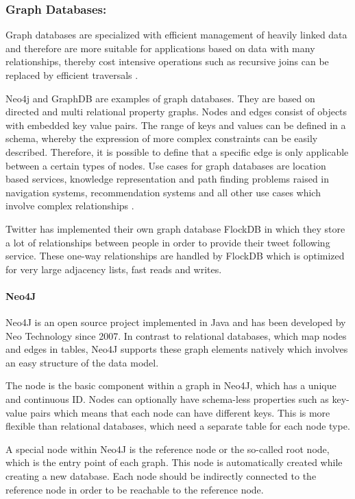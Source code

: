 \subsubsection{Graph Databases:}
Graph databases are specialized with efficient management of heavily linked data and therefore are more suitable for applications based on data with many relationships, thereby cost intensive operations such as recursive joins can be replaced by efficient traversals \cite{Hecht:2011}.

Neo4j and GraphDB are examples of graph databases. They are based on directed and multi relational property graphs. Nodes and edges consist of objects with embedded key value pairs. The range of keys and values can be defined in a schema, whereby the expression of more complex constraints can be easily described. Therefore, it is possible to define that a specific edge is only applicable between a certain types of nodes. Use cases for graph databases are location based services, knowledge representation and path finding problems raised in navigation systems, recommendation systems and all other use cases which involve complex relationships \cite{Hecht:2011}.

Twitter has implemented their own graph database FlockDB in which they store a lot of relationships between people in order to provide their tweet following service. These one-way relationships are handled by FlockDB which is optimized for very large adjacency lists, fast reads and writes.

\paragraph{Neo4J}
Neo4J is an open source project implemented in Java and has been developed by Neo Technology since 2007. In contrast to relational databases, which map nodes and edges in tables, Neo4J supports these graph elements natively which involves an easy structure of the data model.

The node is the basic component within a graph in Neo4J, which has a unique and continuous ID. Nodes can optionally have schema-less properties such as key-value pairs which means that each node can have different keys. This is more flexible than relational databases, which need a separate table for each node type. 

A special node within Neo4J is the reference node or the so-called root node, which is the entry point of each graph. This node is automatically created while creating a new database. Each node should be indirectly connected to the reference node in order to be reachable to the reference node.

